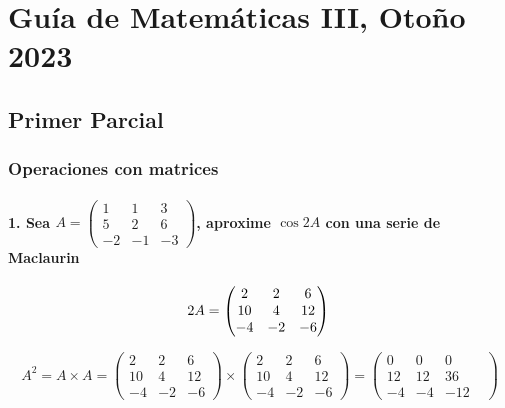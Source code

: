 \documentclass[
]{article}
\author{}
\date{\vspace{-2.5em}}
\begin{document}
\hypertarget{guuxeda-de-matemuxe1ticas-iii-otouxf1o-2023}{%
\section{Guía de Matemáticas III, Otoño
2023}\label{guuxeda-de-matemuxe1ticas-iii-otouxf1o-2023}}

\hypertarget{primer-parcial}{%
\subsection{Primer Parcial}\label{primer-parcial}}

\hypertarget{operaciones-con-matrices}{%
\subsubsection{Operaciones con
matrices}\label{operaciones-con-matrices}}

\hypertarget{sea-a-beginpmatrix-1-1-3-5-2-6--2--1--3endpmatrix-aproxime-cos2a-con-una-serie-de-maclaurin}{%
\paragraph{\texorpdfstring{1. Sea
\(A = \begin{pmatrix} 1 & 1 & 3 \\ 5 & 2 & 6\\ -2 & -1& -3\end{pmatrix}\),
aproxime \(\cos{2A}\) con una serie de
Maclaurin}{1. Sea A = \textbackslash begin\{pmatrix\} 1 \& 1 \& 3 \textbackslash\textbackslash{} 5 \& 2 \& 6\textbackslash\textbackslash{} -2 \& -1\& -3\textbackslash end\{pmatrix\}, aproxime \textbackslash cos\{2A\} con una serie de Maclaurin}}\label{sea-a-beginpmatrix-1-1-3-5-2-6--2--1--3endpmatrix-aproxime-cos2a-con-una-serie-de-maclaurin}}

\[
2A = \begin{pmatrix}
    2 & 2 & 6 \\
    10 & 4 & 12 \\
    -4 & -2 & -6
\end{pmatrix} \\
\]

\[
A^2 = A\times A =
\begin{pmatrix}
2 & 2 & 6 \\
10 & 4 & 12 \\
-4& -2 &-6
\end {pmatrix} \times \begin{pmatrix}
2 & 2 & 6 \\
10 & 4 & 12 \\
-4& -2 &-6
\end {pmatrix} = \begin{pmatrix}
0&0&0&\\12&12&36\\-4&-4&-12
\end {pmatrix}
\]
\end{document}
